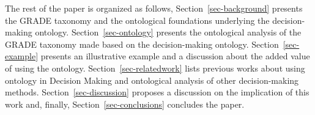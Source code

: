 

The rest of the paper is organized as follows, Section~\ref{sec-background} presents the GRADE taxonomy and the ontological foundations underlying the decision-making ontology. Section~\ref{sec-ontology} presents the ontological analysis of the GRADE taxonomy made based on the decision-making ontology. Section~\ref{sec-example} presents an illustrative example and a discussion about the added value of using the ontology. Section~\ref{sec-relatedwork} lists previous works about using ontology in Decision Making and ontological analysis of other decision-making methods. Section~\ref{sec-discussion} proposes a discussion 
on the implication of this work and, finally, Section~\ref{sec-conclusions} concludes the paper.


